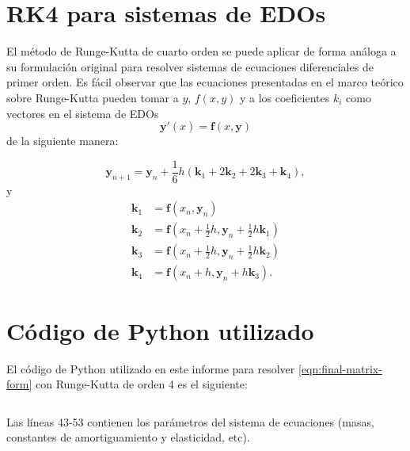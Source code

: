 \appendix

\section{RK4 para sistemas de EDOs}\label{appendix:rk4-systems}

El método de Runge-Kutta de cuarto orden se puede aplicar de forma análoga a su formulación original para resolver sistemas de ecuaciones diferenciales de primer orden. Es fácil observar que las ecuaciones presentadas en el marco teórico sobre Runge-Kutta pueden tomar a \(y\), \(f(x, y)\) y a los coeficientes \(k_i\) como vectores en el sistema de EDOs
\[
    \mathbf{y}'(x) = \mathbf{f}(x, \mathbf{y})
\]
de la siguiente manera:

\[
    \mathbf{y}_{n+1} = \mathbf{y}_n + \frac{1}{6}h(\mathbf{k}_1 + 2\mathbf{k}_2 + 2\mathbf{k}_3 + \mathbf{k}_4)
,\]
y
\begin{align*}
    \mathbf{k}_1 &= \mathbf{f}(x_n, \mathbf{y}_n) \\
    \mathbf{k}_2 &= \mathbf{f}(x_n + \frac{1}{2}h, \mathbf{y}_n + \frac{1}{2}h\mathbf{k}_1) \\
    \mathbf{k}_3 &= \mathbf{f}(x_n + \frac{1}{2}h, \mathbf{y}_n + \frac{1}{2}h\mathbf{k}_2) \\
    \mathbf{k}_4 &= \mathbf{f}(x_n + h, \mathbf{y}_n + h\mathbf{k}_3)
.\end{align*}


\section{Código de Python utilizado}\label{appendix:rk4-code}

El código de Python utilizado en este informe para resolver \eqref{eqn:final-matrix-form} con Runge-Kutta de orden 4 es el siguiente:

\inputminted{python}{./rk4.py}

Las líneas 43-53 contienen los parámetros del sistema de ecuaciones (masas, constantes de amortiguamiento y elasticidad, etc).